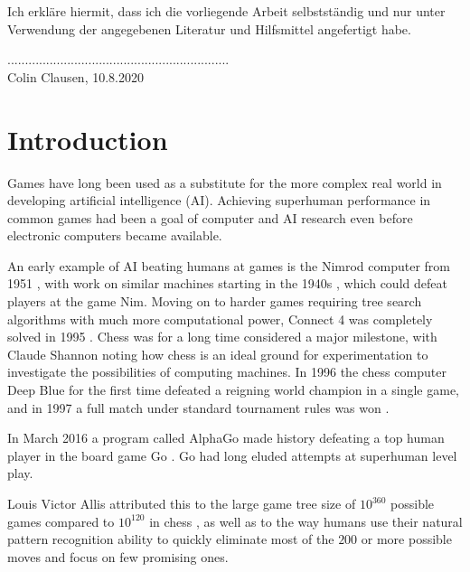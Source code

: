 \documentclass[12pt,onecolumn,oneside,titlepage]{article}
\begin{document}
\noindent Ich erkläre hiermit, dass ich die vorliegende Arbeit selbstständig und nur unter Verwendung der angegebenen Literatur und Hilfsmittel angefertigt habe.

\vspace{2cm}
\noindent ............................................................... \\
Colin Clausen, 10.8.2020

\thispagestyle{empty}

\pagebreak

\newpage\null\thispagestyle{empty}\newpage


\tableofcontents

\pagebreak



\section{Introduction}

Games have long been used as a substitute for the more complex real world in developing artificial intelligence (AI).
Achieving superhuman performance in common games had been a goal of computer and AI research even before electronic computers became available.

An early example of AI beating humans at games is the Nimrod computer from 1951 \cite{nimrod}, with work on similar machines starting in the 1940s \cite{nimmath}, which could defeat players at the game Nim.
Moving on to harder games requiring tree search algorithms with much more computational power, Connect 4 was completely solved in 1995 \cite{trompsolved}.
Chess was for a long time considered a major milestone, with Claude Shannon \cite{shannon1950xxii} noting how chess is an ideal ground for experimentation to investigate the possibilities of computing machines.
In 1996 the chess computer Deep Blue for the first time defeated a reigning world champion in a single game, and in 1997 a full match under standard tournament rules was won \cite{campbell2002deep}.

In March 2016 a program called AlphaGo made history defeating a top human player in the board game Go \cite{leesedolVsAlphaGo}.
Go had long eluded attempts at superhuman level play.

Louis Victor Allis attributed \cite{allis1994searching} this to the large game tree size of $10^{360}$ possible games compared to $10^{120}$ in chess \cite{shannon1950xxii},
as well as to the way humans use their natural pattern recognition ability to quickly eliminate most of the $200$ or more possible moves and focus on few promising ones.
\end{document}
